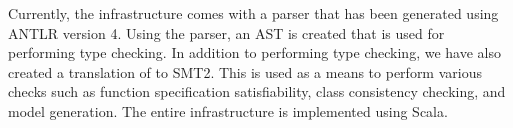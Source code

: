 Currently, the \Klang{} infrastructure comes with a parser that has
been generated using ANTLR version 4. Using the parser, an AST is
created that is used for performing type checking. In addition to
performing type checking, we have also created a translation of
\Klang{} to SMT2. This is used as a means to perform various checks
such as function specification satisfiability, class consistency
checking, and model generation. The entire \Klang{} infrastructure is
implemented using Scala.

 
